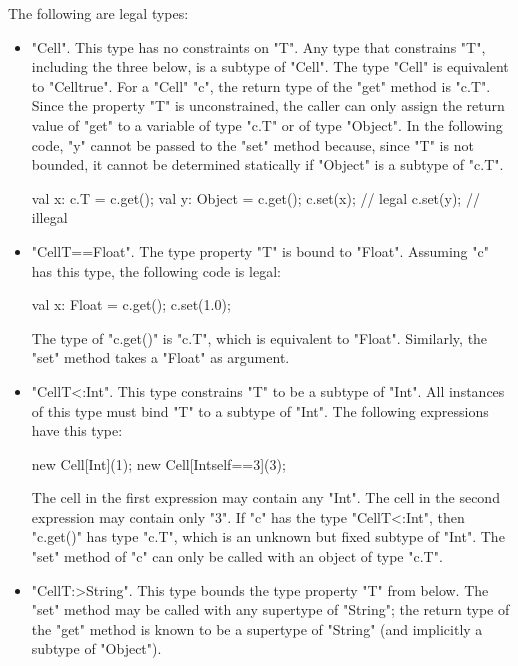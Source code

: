 The following are legal types:
\begin{itemize}
\item \xcd"Cell".  This type has no constraints on \xcd"T".
Any type that constrains \xcd"T", including the three below,
is a subtype of \xcd"Cell".  The type \xcd"Cell" is equivalent to
\xcd"Cell{true}".
%
For a \xcd"Cell" \xcd"c", the return type of the \xcd"get" method 
is \xcd"c.T".  
Since the property \xcd"T" is unconstrained,  
the caller can only assign the return value of \xcd"get"
to a variable of type \xcd"c.T" or of type \xcd"Object".
In the following code, \xcd"y" cannot be passed to the \xcd"set" method
because, since \xcd"T" is not bounded,
it cannot be determined statically if \xcd"Object" is a
subtype of \xcd"c.T".
\begin{xten}
val x: c.T = c.get();
val y: Object = c.get();
c.set(x); // legal
c.set(y); // illegal
\end{xten}

\item \xcd"Cell{T==Float}".
The type property \xcd"T" is bound to \xcd"Float".
Assuming \xcd"c" has this type, the following code is legal:
\begin{xten}
val x: Float = c.get();
c.set(1.0);
\end{xten}
The type of \xcd"c.get()" is \xcd"c.T", which is equivalent to
\xcd"Float".
Similarly, the \xcd"set" method takes a \xcd"Float" as argument.

\item \xcd"Cell{T<:Int}".
This type constrains \xcd"T" to be a subtype of \xcd"Int".
All instances of this type must bind \xcd"T" to a subtype of \xcd"Int".
The following expressions have this type:
\begin{xten}
new Cell[Int](1);
new Cell[Int{self==3}](3);
\end{xten}
The cell in the first expression may contain any \xcd"Int".
The cell in the second expression may contain only \xcd"3".
%
If \xcd"c" has the type \xcd"Cell{T<:Int}",
then \xcd"c.get()" has type \xcd"c.T", which is an unknown but
fixed subtype of \xcd"Int".  The \xcd"set" method of \xcd"c" can
only be called with an object of type \xcd"c.T".

\item \xcd"Cell{T:>String}".  This type bounds the type property
\xcd"T"
from below.  The \xcd"set" method may be called with any
supertype of \xcd"String"; the return type of the \xcd"get"
method is known to be a
supertype of \xcd"String" (and implicitly a subtype of \xcd"Object").
\end{itemize}

